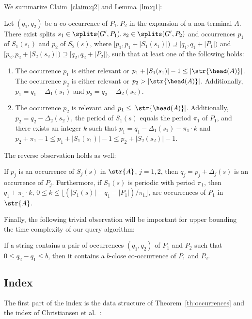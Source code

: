 
We summarize Claim~\ref{claim:q2} and Lemma~\ref{lm:q1}:

\begin{corollary}\label{cor:q1_and_q2}
Let $(q_1,q_2)$ be a co-occurrence of $P_1,P_2$ in the expansion of a non-terminal $A$. There exist splits $s_1 \in \splits(G',P_1), s_2 \in \splits(G',P_2)$ and occurrences $p_1$ of $S_1(s_1)$ and $p_2$ of $S_2(s)$, where $[p_1,p_1+|S_1(s_1)|) \supseteq [q_1,q_1+|P_1|)$ and $[p_2,p_2+|S_2(s_2)|) \supseteq [q_2,q_2+|P_2|)$, such that at least one of the following holds:
\begin{enumerate}
\item \label{it:aperiodic} The occurrence $p_1$ is either relevant or $p_1+|S_1(s_1)|-1 \le |\str{\head(A)}|$. The occurrence $p_2$ is either relevant or $p_2 > |\str{\head(A)}|$. Additionally, $p_1 = q_1 - \Delta_1(s_1)$ and $p_2 = q_2 - \Delta_2(s_2)$. 
\item \label{it:periodic} The occurrence $p_2$ is relevant and $p_1 \le |\str{\head(A)}|$. Additionally, $p_2 = q_2 - \Delta_2(s_2)$, the period of $S_1(s)$ equals the period $\pi_1$ of $P_1$, and there exists an integer $k$ such that $p_1 = q_1-\Delta_1(s_1)-\pi_1 \cdot k$ and $p_2+\pi_1-1 \le p_1 +|S_1(s_1)|-1 \le p_2+|S_2(s_2)|-1$.
\end{enumerate}
\end{corollary}

The reverse observation holds as well:

\begin{observation}\label{obs:rev_q1_and_q2}
If $p_j$ is an occurrence of $S_j(s)$ in $\str{A}$, $j = 1,2$, then $q_j = p_j+\Delta_j(s)$ is an occurrence of $P_j$. Furthermore, if $S_1(s)$ is periodic with period $\pi_1$, then $q_1 + \pi_1 \cdot k$, $0 \le k \le \lfloor (|S_1(s)|-q_1-|P_1|)/\pi_1\rfloor$, are occurrences of $P_1$ in $\str{A}$. 
\end{observation}

Finally, the following trivial observation will be important for upper bounding the time complexity of our query algorithm:

\begin{observation}\label{obs:close}
If a string contains a pair of occurrences $(q_1,q_2)$ of $P_1$ and $P_2$ such that $0 \leq q_2-q_1\leq b$, then it contains a $b$-close co-occurrence of $P_1$ and $P_2$.
\end{observation}

\subsection{Index}
The first part of the index is the data structure of Theorem~\ref{th:occurrences} and the index of Christiansen et al.~\cite{talg/ChristiansenEKN21}:

